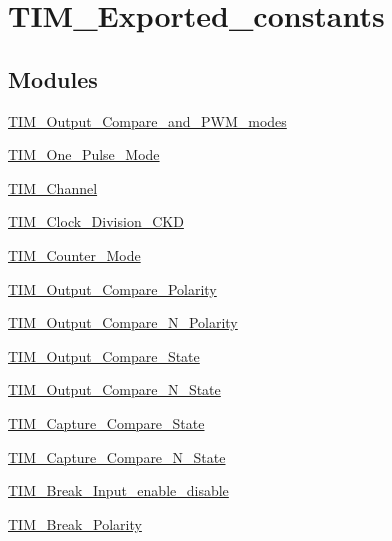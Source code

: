 \hypertarget{group___t_i_m___exported__constants}{}\section{T\+I\+M\+\_\+\+Exported\+\_\+constants}
\label{group___t_i_m___exported__constants}
\subsection*{Modules}
\begin{DoxyCompactItemize}
\item 
\hyperlink{group___t_i_m___output___compare__and___p_w_m__modes}{T\+I\+M\+\_\+\+Output\+\_\+\+Compare\+\_\+and\+\_\+\+P\+W\+M\+\_\+modes}
\item 
\hyperlink{group___t_i_m___one___pulse___mode}{T\+I\+M\+\_\+\+One\+\_\+\+Pulse\+\_\+\+Mode}
\item 
\hyperlink{group___t_i_m___channel}{T\+I\+M\+\_\+\+Channel}
\item 
\hyperlink{group___t_i_m___clock___division___c_k_d}{T\+I\+M\+\_\+\+Clock\+\_\+\+Division\+\_\+\+C\+KD}
\item 
\hyperlink{group___t_i_m___counter___mode}{T\+I\+M\+\_\+\+Counter\+\_\+\+Mode}
\item 
\hyperlink{group___t_i_m___output___compare___polarity}{T\+I\+M\+\_\+\+Output\+\_\+\+Compare\+\_\+\+Polarity}
\item 
\hyperlink{group___t_i_m___output___compare___n___polarity}{T\+I\+M\+\_\+\+Output\+\_\+\+Compare\+\_\+\+N\+\_\+\+Polarity}
\item 
\hyperlink{group___t_i_m___output___compare___state}{T\+I\+M\+\_\+\+Output\+\_\+\+Compare\+\_\+\+State}
\item 
\hyperlink{group___t_i_m___output___compare___n___state}{T\+I\+M\+\_\+\+Output\+\_\+\+Compare\+\_\+\+N\+\_\+\+State}
\item 
\hyperlink{group___t_i_m___capture___compare___state}{T\+I\+M\+\_\+\+Capture\+\_\+\+Compare\+\_\+\+State}
\item 
\hyperlink{group___t_i_m___capture___compare___n___state}{T\+I\+M\+\_\+\+Capture\+\_\+\+Compare\+\_\+\+N\+\_\+\+State}
\item 
\hyperlink{group___t_i_m___break___input__enable__disable}{T\+I\+M\+\_\+\+Break\+\_\+\+Input\+\_\+enable\+\_\+disable}
\item 
\hyperlink{group___t_i_m___break___polarity}{T\+I\+M\+\_\+\+Break\+\_\+\+Polarity}

\end{DoxyCompactItemize}
